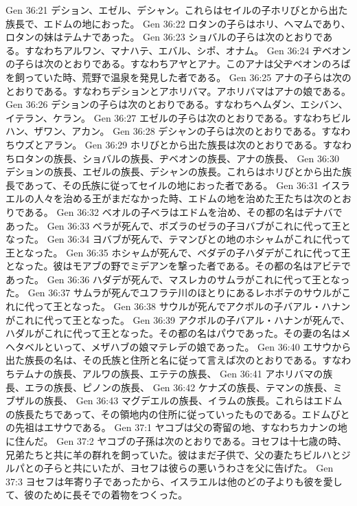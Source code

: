 Gen 36:21  デション、エゼル、デシャン。これらはセイルの子ホリびとから出た族長で、エドムの地におった。
Gen 36:22  ロタンの子らはホリ、ヘマムであり、ロタンの妹はテムナであった。
Gen 36:23  ショバルの子らは次のとおりである。すなわちアルワン、マナハテ、エバル、シポ、オナム。
Gen 36:24  ヂベオンの子らは次のとおりである。すなわちアヤとアナ。このアナは父ヂベオンのろばを飼っていた時、荒野で温泉を発見した者である。
Gen 36:25  アナの子らは次のとおりである。すなわちデションとアホリバマ。アホリバマはアナの娘である。
Gen 36:26  デションの子らは次のとおりである。すなわちヘムダン、エシバン、イテラン、ケラン。
Gen 36:27  エゼルの子らは次のとおりである。すなわちビルハン、ザワン、アカン。
Gen 36:28  デシャンの子らは次のとおりである。すなわちウズとアラン。
Gen 36:29  ホリびとから出た族長は次のとおりである。すなわちロタンの族長、ショバルの族長、ヂベオンの族長、アナの族長、
Gen 36:30  デションの族長、エゼルの族長、デシャンの族長。これらはホリびとから出た族長であって、その氏族に従ってセイルの地におった者である。
Gen 36:31  イスラエルの人々を治める王がまだなかった時、エドムの地を治めた王たちは次のとおりである。
Gen 36:32  ベオルの子ベラはエドムを治め、その都の名はデナバであった。
Gen 36:33  ベラが死んで、ボズラのゼラの子ヨバブがこれに代って王となった。
Gen 36:34  ヨバブが死んで、テマンびとの地のホシャムがこれに代って王となった。
Gen 36:35  ホシャムが死んで、ベダデの子ハダデがこれに代って王となった。彼はモアブの野でミデアンを撃った者である。その都の名はアビテであった。
Gen 36:36  ハダデが死んで、マスレカのサムラがこれに代って王となった。
Gen 36:37  サムラが死んでユフラテ川のほとりにあるレホボテのサウルがこれに代って王となった。
Gen 36:38  サウルが死んでアクボルの子バアル・ハナンがこれに代って王となった。
Gen 36:39  アクボルの子バアル・ハナンが死んで、ハダルがこれに代って王となった。その都の名はパウであった。その妻の名はメヘタベルといって、メザハブの娘マテレデの娘であった。
Gen 36:40  エサウから出た族長の名は、その氏族と住所と名に従って言えば次のとおりである。すなわちテムナの族長、アルワの族長、エテテの族長、
Gen 36:41  アホリバマの族長、エラの族長、ピノンの族長、
Gen 36:42  ケナズの族長、テマンの族長、ミブザルの族長、
Gen 36:43  マグデエルの族長、イラムの族長。これらはエドムの族長たちであって、その領地内の住所に従っていったものである。エドムびとの先祖はエサウである。
Gen 37:1  ヤコブは父の寄留の地、すなわちカナンの地に住んだ。
Gen 37:2  ヤコブの子孫は次のとおりである。ヨセフは十七歳の時、兄弟たちと共に羊の群れを飼っていた。彼はまだ子供で、父の妻たちビルハとジルパとの子らと共にいたが、ヨセフは彼らの悪いうわさを父に告げた。
Gen 37:3  ヨセフは年寄り子であったから、イスラエルは他のどの子よりも彼を愛して、彼のために長そでの着物をつくった。
